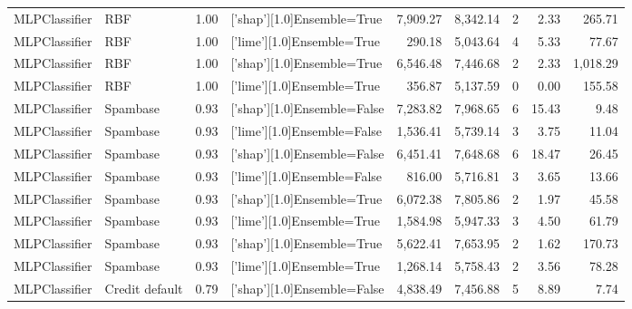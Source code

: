 \begin{tabular}{llrlrrlrr}
MLPClassifier &            RBF &      1.00 &  ['shap'][1.0]Ensemble=True &   7,909.27 &                 8,342.14 &               2 &               2.33 &   265.71 \\
MLPClassifier &            RBF &      1.00 &  ['lime'][1.0]Ensemble=True &     290.18 &                 5,043.64 &               4 &               5.33 &    77.67 \\
MLPClassifier &            RBF &      1.00 &  ['shap'][1.0]Ensemble=True &   6,546.48 &                 7,446.68 &               2 &               2.33 & 1,018.29 \\
MLPClassifier &            RBF &      1.00 &  ['lime'][1.0]Ensemble=True &     356.87 &                 5,137.59 &               0 &               0.00 &   155.58 \\
MLPClassifier &       Spambase &      0.93 & ['shap'][1.0]Ensemble=False &   7,283.82 &                 7,968.65 &               6 &              15.43 &     9.48 \\
MLPClassifier &       Spambase &      0.93 & ['lime'][1.0]Ensemble=False &   1,536.41 &                 5,739.14 &               3 &               3.75 &    11.04 \\
MLPClassifier &       Spambase &      0.93 & ['shap'][1.0]Ensemble=False &   6,451.41 &                 7,648.68 &               6 &              18.47 &    26.45 \\
MLPClassifier &       Spambase &      0.93 & ['lime'][1.0]Ensemble=False &     816.00 &                 5,716.81 &               3 &               3.65 &    13.66 \\
MLPClassifier &       Spambase &      0.93 &  ['shap'][1.0]Ensemble=True &   6,072.38 &                 7,805.86 &               2 &               1.97 &    45.58 \\
MLPClassifier &       Spambase &      0.93 &  ['lime'][1.0]Ensemble=True &   1,584.98 &                 5,947.33 &               3 &               4.50 &    61.79 \\
MLPClassifier &       Spambase &      0.93 &  ['shap'][1.0]Ensemble=True &   5,622.41 &                 7,653.95 &               2 &               1.62 &   170.73 \\
MLPClassifier &       Spambase &      0.93 &  ['lime'][1.0]Ensemble=True &   1,268.14 &                 5,758.43 &               2 &               3.56 &    78.28 \\
MLPClassifier & Credit default &      0.79 & ['shap'][1.0]Ensemble=False &   4,838.49 &                 7,456.88 &               5 &               8.89 &     7.74 \\

\end{tabular}
